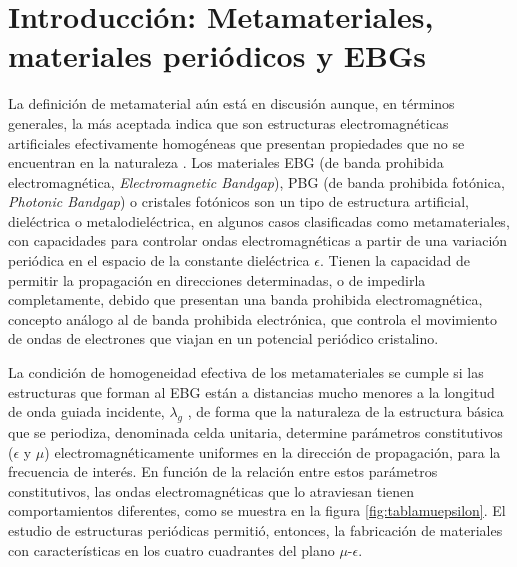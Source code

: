 
\section{Introducción: Metamateriales, materiales periódicos y EBGs}
\label{sec_resenia_metamateriales}


La definición de metamaterial aún está en discusión aunque, en términos generales, la más aceptada indica que son estructuras electromagnéticas artificiales efectivamente homogéneas que presentan propiedades que no se encuentran en la naturaleza \cite{Caloz:ElectromagneticMetamaterials}. Los materiales EBG (de banda prohibida electromagnética, \textit{Electromagnetic Bandgap}), PBG (de banda prohibida fotónica, \textit{Photonic Bandgap}) o cristales fotónicos son un tipo de estructura artificial, dieléctrica o metalodieléctrica, en algunos casos clasificadas como metamateriales, con capacidades para controlar ondas electromagnéticas \cite{Engheta} a partir de una variación periódica en el espacio de la constante dieléctrica $\epsilon$. Tienen la capacidad de permitir la propagación en direcciones determinadas, o de impedirla completamente, debido que presentan una banda prohibida electromagnética, concepto análogo al de banda prohibida electrónica, que controla el movimiento de ondas de electrones que viajan en un potencial periódico cristalino.

La condición de homogeneidad efectiva de los metamateriales se cumple si las estructuras que forman al EBG están a distancias mucho menores a la longitud de onda guiada incidente, $\lambda_g$ \cite{Caloz:ElectromagneticMetamaterials}, de forma que la naturaleza de la estructura básica que se periodiza, denominada celda unitaria, determine parámetros constitutivos ($\epsilon$ y $\mu$) electromagnéticamente uniformes en la dirección de propagación, para la frecuencia de interés. En función de la relación entre estos parámetros constitutivos, las ondas electromagnéticas que lo atraviesan tienen comportamientos diferentes, como se muestra en la figura \ref{fig:tablamuepsilon}. El estudio de estructuras periódicas permitió, entonces, la fabricación de materiales con características en los cuatro cuadrantes del plano $\mu$-$\epsilon$.

